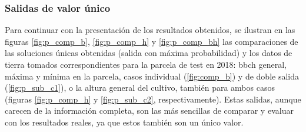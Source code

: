 \subsubsection{Salidas de valor único}
\par Para continuar con la presentación de los resultados obtenidos, se ilustran en las figuras \ref{fig:p_comp_b}, \ref{fig:p_comp_h} y \ref{fig:p_comp_bh} las comparaciones de las soluciones únicas obtenidas (salida con máxima probabilidad) y los datos de tierra tomados correspondientes para la parcela de test en 2018: \gls{bbch} general, máxima y mínima en la parcela, casos individual (\ref{fig:comp_b}) y de doble salida (\ref{fig:p_sub_c1}), o la altura general del cultivo, también para ambos casos (figuras \ref{fig:p_comp_h} y \ref{fig:p_sub_c2}, respectivamente). Estas salidas, aunque carecen de la información completa, son las más sencillas de comparar y evaluar con los resultados reales, ya que estos también son un único valor.  
\\

